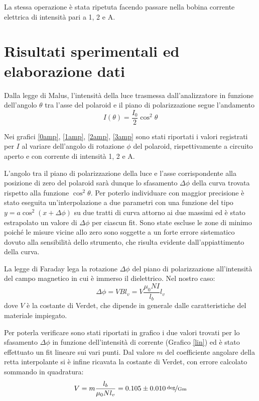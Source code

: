 \documentclass[italian,a4paper]{article}
\begin{document}
La stessa operazione è stata ripetuta facendo passare nella bobina corrente elettrica di intensità pari a 1, 2 e \unit[3]{A}.
\section{Risultati sperimentali ed elaborazione dati}
Dalla legge di Malus, l'intensità della luce trasmessa dall'analizzatore in funzione dell'angolo $\theta$ tra l'asse del polaroid e il piano di polarizzazione segue l'andamento
\begin{equation*}
I(\theta)=\dfrac{I_0}{2}\cos^2\theta 
\end{equation*}

Nei grafici \ref{0amp}, \ref{1amp}, \ref{2amp}, \ref{3amp} sono stati riportati i valori registrati per $I$ al variare dell'angolo di rotazione $\phi$ del polaroid, rispettivamente a circuito aperto e con corrente di intensità 1, 2 e \unit[3]{A}.

L'angolo tra il piano di polarizzazione della luce e l'asse corrispondente alla posizione di zero del polaroid sarà dunque lo sfasamento $\Delta\phi$ della curva trovata rispetto alla funzione $\cos^2\theta$. Per poterlo individuare con maggior precisione è stato eseguita un'interpolazione a due parametri con una funzione del tipo $y=a\cos^2(x+\Delta\phi)$ su due tratti di curva attorno ai due massimi ed è stato estrapolato un valore di $\Delta\phi$ per ciascun fit. Sono state escluse le zone di minimo poiché le misure vicine allo zero sono soggette a un forte errore sistematico dovuto alla sensibilità dello strumento, che risulta evidente dall'appiattimento della curva.

La legge di Faraday lega la rotazione $\Delta\phi$ del piano di polarizzazione all'intensità del campo magnetico in cui è immerso il dielettrico. Nel nostro caso:
\begin{equation*}
\Delta\phi=VBl_v=V\dfrac{\mu_0NI}{l_b}l_v
\end{equation*}
dove $V$ è la costante di Verdet, che dipende in generale dalle caratteristiche del materiale impiegato.

Per poterla verificare sono stati riportati in grafico i due valori trovati per lo sfasamento $\Delta\phi$ in funzione dell'intensità di corrente (Grafico \ref{lin}) ed è stato effettuato un fit lineare sui vari punti.
Dal valore $m$ del coefficiente angolare della retta interpolante si è infine ricavata la costante di Verdet, con errore calcolato sommando in quadratura:
\begin{equation*}
V= m\dfrac{l_b}{\mu_0 N l_v}= \unitfrac[0.105 \pm 0.010]{deg}{Gm}
\end{equation*}
\end{document}
